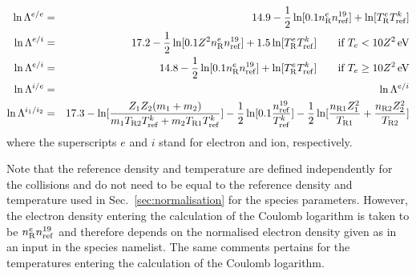 \begin{eqnarray}
\ln \Lambda^{e/e} &=& 14.9 - \frac{1}{2}\ln[0.1n_{\rm R}^e n_{\rm ref}^{19}] + \ln[T_{\rm R}^e T_{\rm ref}^k]\\
\ln \Lambda^{e/i} &=& 17.2 - \frac{1}{2}\ln[0.1Z^2n_{\rm R}^e n_{\rm ref}^{19}] + 1.5\ln[T_{\rm R}^e T_{\rm ref}^k] \qquad \textrm{if} \,\, T_e < 10Z^2\,\rm{eV}\\
\ln \Lambda^{e/i} &=& 14.8 - \frac{1}{2}\ln[0.1n_{\rm R}^e n_{\rm ref}^{19}] + \ln[T_{\rm R}^e T_{\rm ref}^k] \qquad \textrm{if} \,\, T_e \geq 10Z^2\,\rm{eV}\\
\ln \Lambda^{i/e} &=& \ln \Lambda^{e/i} \\
\ln \Lambda^{i_1/i_2} &=& 17.3 -\ln[\frac{Z_1Z_2(m_1+m_2)}{m_1T_{\rm R2}T_{\rm ref}^k+m_2T_{\rm R1}T_{\rm ref}^k}] - \frac{1}{2}\ln[0.1\frac{n_{\rm ref}^{19}}{T_{\rm ref}^k}] -\frac{1}{2}\ln[\frac{n_{\rm R1}Z_1^2}{T_{\rm R1}}+\frac{n_{\rm R2}Z_2^2}{T_{\rm R2}}]
\end{eqnarray}
where the superscripts $e$ and $i$ stand for electron and ion, respectively.

Note that the reference density and temperature are defined independently for the collisions and do not need to be equal to the reference density and temperature used in Sec.~\ref{sec:normalisation} for the species parameters. However, the electron density entering the calculation of the Coulomb logarithm is taken to be $n_{\rm R}^e n_{\rm ref}^{19}$ and therefore depends on the normalised electron density given as in an input in the species namelist. The same comments pertains for the temperatures entering the calculation of the Coulomb logarithm.


